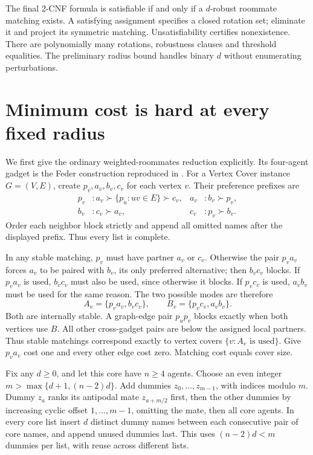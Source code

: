 \documentclass[11pt]{article}
\begin{document}
The final 2-CNF formula is satisfiable if and only if a $d$-robust
roommate matching exists. A satisfying assignment specifies a closed
rotation set; eliminate it and project its symmetric matching.
Unsatisfiability certifies nonexistence. There are polynomially many
rotations, robustness clauses and threshold equalities. The preliminary
radius bound handles binary $d$ without enumerating perturbations.

\section{Minimum cost is hard at every fixed radius}
We first give the ordinary weighted-roommates reduction explicitly.
Its four-agent gadget is the Feder construction reproduced in
\cite[\S4.1, proof of Proposition 6]{adapting}.
For a Vertex Cover instance $G=(V,E)$, create $p_v,a_v,b_v,c_v$ for
each vertex $v$. Their preference prefixes are
\[
\begin{aligned}
 p_v&:a_v\succ \{p_u:uv\in E\}\succ c_v,&
 a_v&:b_v\succ p_v,\\
 b_v&:c_v\succ a_v,& c_v&:p_v\succ b_v.
\end{aligned}
\]
Order each neighbor block strictly and append all omitted names after
the displayed prefix. Thus every list is complete.

In any stable matching, $p_v$ must have partner $a_v$ or $c_v$.
Otherwise the pair $p_va_v$ forces $a_v$ to be paired with $b_v$, its
only preferred alternative; then $b_vc_v$ blocks. If $p_va_v$ is used,
$b_vc_v$ must also be used, since otherwise it blocks. If $p_vc_v$ is
used, $a_vb_v$ must be used for the same reason. The two possible modes
are therefore
\[
 A_v=\{p_va_v,b_vc_v\},\qquad B_v=\{p_vc_v,a_vb_v\}.
\]
Both are internally stable. A graph-edge pair $p_up_v$ blocks exactly
when both vertices use $B$. All other cross-gadget pairs are below
the assigned local partners. Thus stable matchings correspond exactly
to vertex covers $\{v:A_v\text{ is used}\}$. Give $p_va_v$ cost one
and every other edge cost zero. Matching cost equals cover size.

Fix any $d\geq0$, and let this core have $n\geq4$ agents. Choose an
even integer $m>\max\{d+1,(n-2)d\}$. Add dummies
$z_0,\ldots,z_{m-1}$, with indices modulo $m$. Dummy $z_a$ ranks its
antipodal mate $z_{a+m/2}$ first, then the other dummies by increasing
cyclic offset $1,\ldots,m-1$, omitting the mate, then all core agents.
In every core list insert $d$ distinct dummy names between each
consecutive pair of core names, and append unused dummies last.
This uses $(n-2)d<m$ dummies per list, with reuse across different lists.
\end{document}
